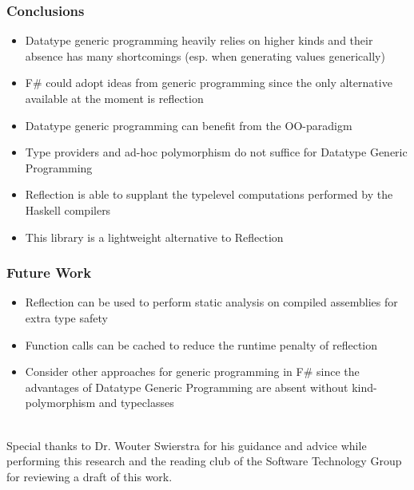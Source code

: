\documentclass{beamer}
\begin{document}
\begin{frame}
  \frametitle{Conclusions}

  \begin{itemize}

    \item Datatype generic programming heavily relies on higher kinds
      and their absence has many shortcomings (esp. when generating
      values generically)

    \item F\# could adopt ideas from generic programming since the
      only alternative available at the moment is reflection

    \item Datatype generic programming can benefit from the
      OO-paradigm

    \item Type providers and ad-hoc polymorphism do not suffice for
      Datatype Generic Programming

    \item Reflection is able to supplant the typelevel computations
      performed by the Haskell compilers

    \item This library is a lightweight alternative to Reflection
      
  \end{itemize}
  
\end{frame}

\begin{frame}
  \frametitle{Future Work}
  \begin{itemize}

    \item Reflection can be used to perform static analysis on
      compiled assemblies for extra type safety
    \item Function calls can be cached to reduce the runtime penalty
      of reflection
    \item Consider other approaches for generic programming in F\#
      since the advantages of Datatype Generic Programming are absent
      without kind-polymorphism and typeclasses
  \end{itemize}
  
\end{frame}

\begin{frame}

  \vspace{2cm}
  \\Special thanks to Dr. Wouter Swierstra for his guidance and advice
  while performing this research and the reading club of the Software
  Technology Group for reviewing a draft of this work.

\end{frame}
\end{document}
